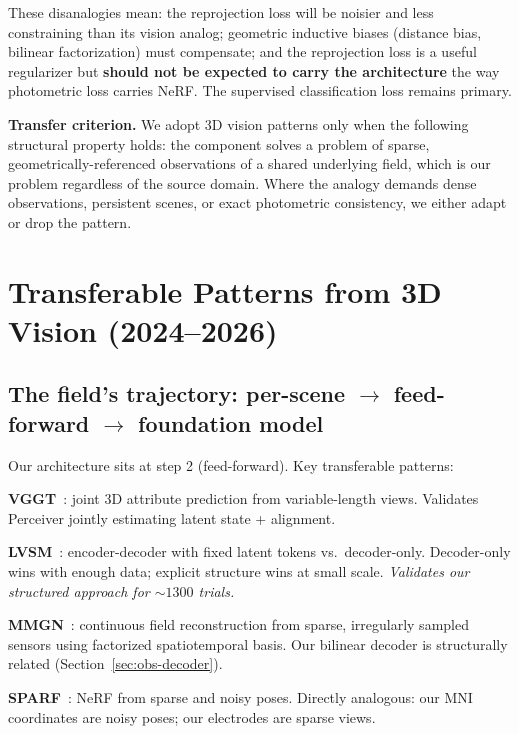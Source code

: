\documentclass[11pt,letterpaper]{article}
\begin{document}
\noindent These disanalogies mean: the reprojection loss will be noisier and less constraining than its vision analog; geometric inductive biases (distance bias, bilinear factorization) must compensate; and the reprojection loss is a useful regularizer but \textbf{should not be expected to carry the architecture} the way photometric loss carries NeRF. The supervised classification loss remains primary.

\textbf{Transfer criterion.} We adopt 3D vision patterns only when the following structural property holds: the component solves a problem of sparse, geometrically-referenced observations of a shared underlying field, which is our problem regardless of the source domain. Where the analogy demands dense observations, persistent scenes, or exact photometric consistency, we either adapt or drop the pattern.

\section{Transferable Patterns from 3D Vision (2024--2026)}

\subsection{The field's trajectory: per-scene \texorpdfstring{$\to$}{to} feed-forward \texorpdfstring{$\to$}{to} foundation model}

Our architecture sits at step 2 (feed-forward). Key transferable patterns:

\textbf{VGGT}~\cite{hewitt2024}: joint 3D attribute prediction from variable-length views. Validates Perceiver jointly estimating latent state + alignment.

\textbf{LVSM}~\cite{jin2024}: encoder-decoder with fixed latent tokens vs.\ decoder-only. Decoder-only wins with enough data; explicit structure wins at small scale. \textit{Validates our structured approach for ${\sim}1300$ trials.}

\textbf{MMGN}~\cite{xiong2024}: continuous field reconstruction from sparse, irregularly sampled sensors using factorized spatiotemporal basis. Our bilinear decoder is structurally related (Section~\ref{sec:obs-decoder}).

\textbf{SPARF}~\cite{truong2023}: NeRF from sparse and noisy poses. Directly analogous: our MNI coordinates are noisy poses; our electrodes are sparse views.
\end{document}
